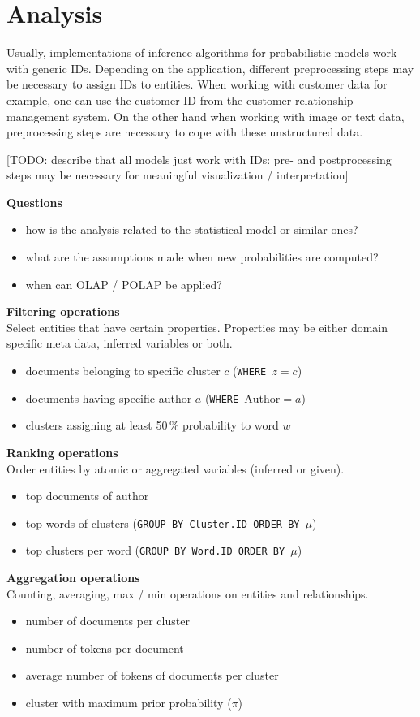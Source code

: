 \section{Analysis}

Usually, implementations of inference algorithms for probabilistic models work with generic IDs. Depending on the application, different preprocessing steps may be necessary to assign IDs to entities. When working with customer data for example, one can use the customer ID from the customer relationship management system. On the other hand when working with image or text data, preprocessing steps are necessary to cope with these unstructured data.

[TODO: describe that all models just work with IDs: pre- and postprocessing steps may be necessary for meaningful visualization / interpretation]

\textbf{Questions}
\begin{itemize}
\item how is the analysis related to the statistical model or similar ones?
\item what are the assumptions made when new probabilities are computed?
\item when can OLAP / POLAP be applied?
\end{itemize}

\textbf{Filtering operations}\\
Select entities that have certain properties. Properties may be either domain specific meta data, inferred variables or both.
\begin{itemize}
\item documents belonging to specific cluster $c$ (\texttt{WHERE $z = c$})
\item documents having specific author $a$ (\texttt{WHERE $\textrm{Author} = a$})
\item clusters assigning at least 50\,\% probability to word $w$
\end{itemize}

\textbf{Ranking operations}\\
Order entities by atomic or aggregated variables (inferred or given).
\begin{itemize}
\item top documents of author
\item top words of clusters (\texttt{GROUP BY \textrm{Cluster.ID} ORDER BY $\mu$})
\item top clusters per word (\texttt{GROUP BY \textrm{Word.ID} ORDER BY $\mu$})
\end{itemize}

\textbf{Aggregation operations}\\
Counting, averaging, max / min operations on entities and relationships.
\begin{itemize}
\item number of documents per cluster
\item number of tokens per document
\item average number of tokens of documents per cluster
\item cluster with maximum prior probability ($\pi$)
\end{itemize}
